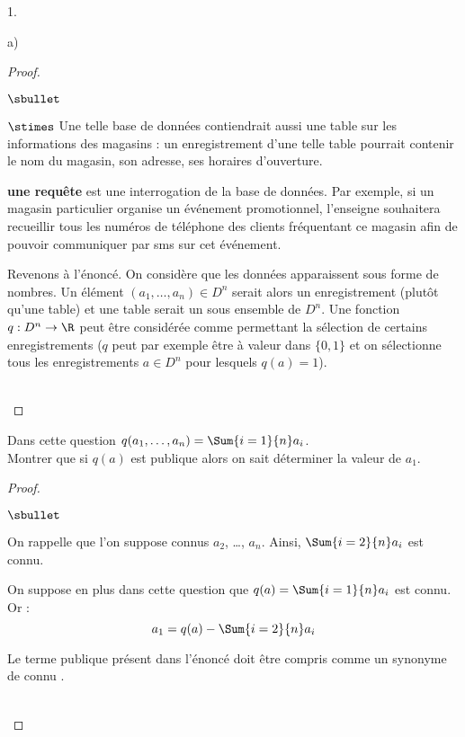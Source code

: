 \begin{noliste}{1.}
\begin{noliste}{a)}
\begin{proof}
\begin{remark}
\begin{noliste}{$\sbullet$}
\begin{noliste}{$\stimes$}
            Une telle base de données contiendrait aussi une table sur
            les informations des magasins : un enregistrement d'une
            telle table pourrait contenir le nom du magasin, son
            adresse, ses horaires d'ouverture.
          \item {\bf une requête} est une interrogation de la base de
            données. Par exemple, si un magasin particulier organise un
            événement promotionnel, l'enseigne
            souhaitera recueillir tous les numéros de téléphone des
            clients fréquentant ce magasin afin de pouvoir
            communiquer par sms sur cet événement.
          \end{noliste}
        \item Revenons à l'énoncé. On considère que les données
          apparaissent sous forme de nombres. Un élément $(a_1,
          \ldots, a_n) \in D^n$ serait alors un enregistrement (plutôt
          qu'une table) et une table serait un sous ensemble de
          $D^n$. Une fonction $q : D^n \to \R$ peut être considérée
          comme permettant la sélection de certains enregistrements
          ($q$ peut par exemple être à valeur dans $\{0, 1\}$ et on
          sélectionne tous les enregistrements $a \in D^n$ pour
          lesquels $q(a) = 1$).
        \end{noliste}
      \end{remark}~\\[-1.4cm]
    \end{proof}


    \newpage


  \item Dans cette question $q(a_1,\ldots,a_n) = \Sum{i=1}{n} a_i$.\\
    Montrer que si $q(a)$ est publique alors on sait déterminer la
    valeur de $a_1$.

    \begin{proof}~%
      \begin{noliste}{$\sbullet$}
      \item On rappelle que l'on suppose connus $a_2$, \ldots,
        $a_n$. Ainsi, $\Sum{i=2}{n} a_i$ est connu.

      \item On suppose en plus dans cette question que $q(a) =
        \Sum{i=1}{n} a_i$ est connu. Or :
        \[
        a_1 = q(a) - \Sum{i=2}{n} a_i
        \]        
      \end{noliste}
      \begin{remark}
        Le terme \og publique \fg{} présent dans l'énoncé doit être
        compris comme un synonyme de \og connu \fg{}.
      \end{remark}~\\[-1cm]
    \end{proof}
  \end{noliste}
\end{noliste}

